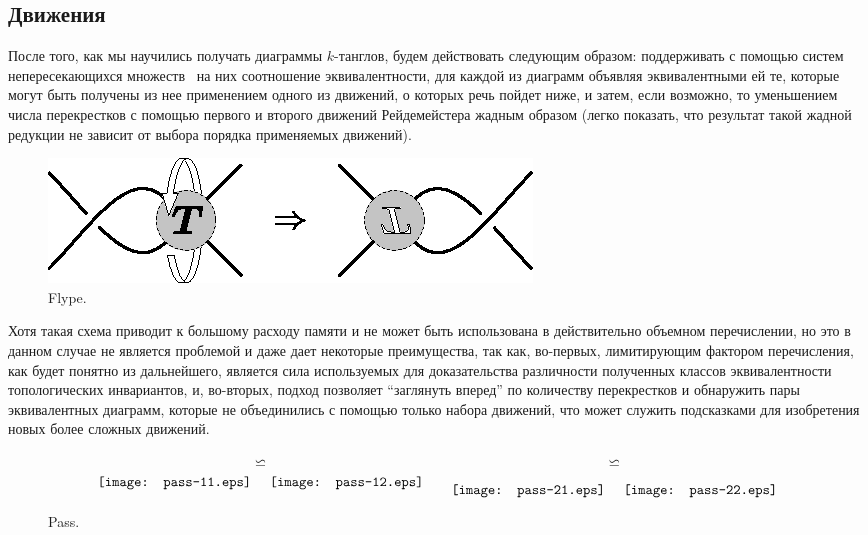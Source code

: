 \documentclass[12pt]{article}
\theoremstyle{plain}
\theoremstyle{definition}
\begin{document}
	\subsection{Движения}

		После того, как мы научились получать диаграммы $k$-танглов, будем действовать следующим образом: поддерживать с помощью
		систем непересекающихся множеств~\cite{CormenLeisersonRivestStein2009, Sedgewick1983} на них соотношение эквивалентности, для
		каждой из диаграмм объявляя эквивалентными ей те, которые могут быть получены из нее применением одного из движений, о которых
		речь пойдет ниже, и затем, если возможно, то уменьшением числа перекрестков с помощью первого и второго движений Рейдемейстера
		жадным образом (легко показать, что результат такой жадной редукции не зависит от выбора порядка применяемых движений).

		\begin{figure}[ht]
			\centering
			\includegraphics{c/flype.eps}
			\caption{\footnotesize Flype.\label{figure:flype}}
		\end{figure}

		Хотя такая схема приводит к большому расходу памяти и не может быть использована в действительно объемном перечислении, но это
		в данном случае не является проблемой и даже дает некоторые преимущества, так как, во-первых, лимитирующим фактором перечисления,
		как будет понятно из дальнейшего, является сила используемых для доказательства различности полученных классов эквивалентности
		топологических инвариантов, и, во-вторых, подход позволяет ``заглянуть вперед'' по количеству перекрестков и обнаружить пары
		эквивалентных диаграмм, которые не объединились с помощью только набора движений, что может служить подсказками для изобретения
		новых более сложных движений.

		\begin{figure}[ht]
			\centering
			$$
			{\raise-5mm\hbox{\protect\texttt{[image: pass-11.eps]}}}
			\backsimeq
			{\raise-5mm\hbox{\protect\texttt{[image: pass-12.eps]}}}
			\qquad
			{\raise-7mm\hbox{\protect\texttt{[image: pass-21.eps]}}}
			\backsimeq
			{\raise-7mm\hbox{\protect\texttt{[image: pass-22.eps]}}}
			$$
			\caption{\footnotesize Pass.\label{figure:pass}}
		\end{figure}
\end{document}
